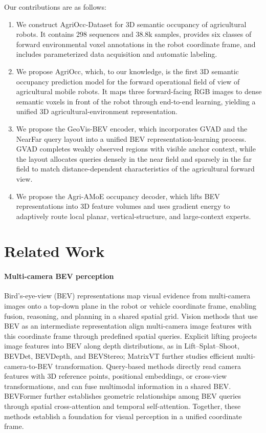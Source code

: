 \documentclass[a4paper,fleqn]{cas-sc}
\begin{document}
Our contributions are as follows:
\begin{enumerate}[leftmargin=1.8em]
\item We construct AgriOcc-Dataset for 3D semantic occupancy of agricultural robots. It contains 298 sequences and 38.8k samples, provides six classes of forward environmental voxel annotations in the robot coordinate frame, and includes parameterized data acquisition and automatic labeling.
\item We propose AgriOcc, which, to our knowledge, is the first 3D semantic occupancy prediction model for the forward operational field of view of agricultural mobile robots. It maps three forward-facing RGB images to dense semantic voxels in front of the robot through end-to-end learning, yielding a unified 3D agricultural-environment representation.
\item We propose the GeoVis-BEV encoder, which incorporates GVAD and the NearFar query layout into a unified BEV representation-learning process. GVAD completes weakly observed regions with visible anchor context, while the layout allocates queries densely in the near field and sparsely in the far field to match distance-dependent characteristics of the agricultural forward view.
\item We propose the Agri-AMoE occupancy decoder, which lifts BEV representations into 3D feature volumes and uses gradient energy to adaptively route local planar, vertical-structure, and large-context experts.
\end{enumerate}

\section{Related Work}\label{sec:related}
\paragraph{Multi-camera BEV perception}
Bird's-eye-view (BEV) representations map visual evidence from multi-camera images onto a top-down plane in the robot or vehicle coordinate frame, enabling fusion, reasoning, and planning in a shared spatial grid. Vision methods that use BEV as an intermediate representation align multi-camera image features with this coordinate frame through predefined spatial queries. Explicit lifting projects image features into BEV along depth distributions, as in Lift--Splat--Shoot, BEVDet, BEVDepth, and BEVStereo\citep{philion2020lift,huang2021bevdet,li2022bevdepth,li2022bevstereo}; MatrixVT further studies efficient multi-camera-to-BEV transformation\citep{zhou2022matrixvt}. Query-based methods directly read camera features with 3D reference points, positional embeddings, or cross-view transformations\citep{wang2022detr3d,li2022petr,liu2023petrv2,li2023fbbev}, and can fuse multimodal information in a shared BEV\citep{liu2023bevfusion}. BEVFormer further establishes geometric relationships among BEV queries through spatial cross-attention and temporal self-attention\citep{li2022bevformer}. Together, these methods establish a foundation for visual perception in a unified coordinate frame.
\end{document}

